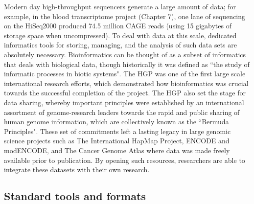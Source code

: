 Modern day high-throughput sequencers generate a large amount of data; for example, in the blood transcriptome project (Chapter 7), one lane of sequencing on the HiSeq2000 produced 74.5 million CAGE reads (using 15 gigabytes of storage space when uncompressed). To deal with data at this scale, dedicated informatics tools for storing, managing, and the analysis of such data sets are absolutely necessary. Bioinformatics can be thought of as a subset of informatics that deals with biological data, though historically it was defined as ``the study of informatic processes in biotic systems"\cite{pmid21483479}. The HGP was one of the first large scale international research efforts, which demonstrated how bioinformatics was crucial towards the successful completion of the project\cite{stein1996perl}. The HGP also set the stage for data sharing, whereby important principles were established by an international assortment of genome-research leaders towards the rapid and public sharing of human genome information, which are collectively known as the ``Bermuda Principles". These set of commitments left a lasting legacy in large genomic science projects such as The International HapMap Project, ENCODE and modENCODE, and The Cancer Genome Atlas where data was made freely available prior to publication\cite{contreras2011bermuda}. By opening such resources, researchers are able to integrate these datasets with their own research.

\subsection{Standard tools and formats}

